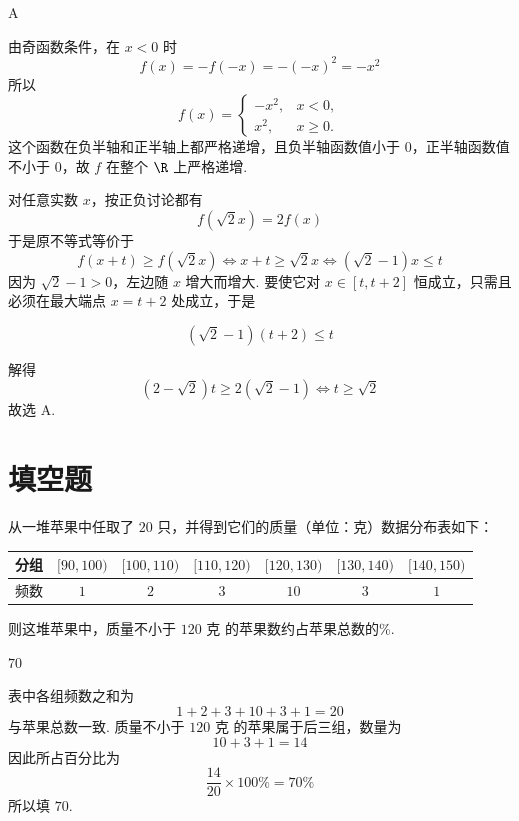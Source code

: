 \begin{answer}
A
\end{answer}

\begin{solution}
由奇函数条件，在 \(x<0\) 时
\[
f(x)=-f(-x)=-(-x)^2=-x^2
\]
所以
\[
f(x)=\begin{cases}
-x^2,&x<0,\\
x^2,&x\geqslant0.
\end{cases}
\]
这个函数在负半轴和正半轴上都严格递增，且负半轴函数值小于 \(0\)，正半轴函数值不小于 \(0\)，故 \(f\) 在整个 \(\R\) 上严格递增.

对任意实数 \(x\)，按正负讨论都有
\[
f(\sqrt2x)=2f(x)
\]
于是原不等式等价于
\[
f(x+t)\geqslant f(\sqrt2x)
\Longleftrightarrow x+t\geqslant\sqrt2x
\Longleftrightarrow (\sqrt2-1)x\leqslant t
\]
因为 \(\sqrt2-1>0\)，左边随 \(x\) 增大而增大. 要使它对 \(x\in[t,t+2]\) 恒成立，只需且必须在最大端点 \(x=t+2\) 处成立，于是

\[
(\sqrt2-1)(t+2)\leqslant t
\]

解得
\[
(2-\sqrt2)t\geqslant2(\sqrt2-1)
\Longleftrightarrow t\geqslant\sqrt2
\]
故选 A.
\end{solution}

\section{填空题}

\begin{problem}
从一堆苹果中任取了 \(20\) 只，并得到它们的质量（单位：克）数据分布表如下：

\begin{center}
\begin{tabular}{|c|c|c|c|c|c|c|}
\hline
分组 & \([90,100)\) & \([100,110)\) & \([110,120)\) & \([120,130)\) & \([130,140)\) & \([140,150)\) \\
\hline
频数 & \(1\) & \(2\) & \(3\) & \(10\) & \(3\) & \(1\) \\
\hline
\end{tabular}
\end{center}

则这堆苹果中，质量不小于 \(120\text{ 克}\) 的苹果数约占苹果总数的\fillinblank{}\%.
\end{problem}

\begin{answer}
\(70\)
\end{answer}

\begin{solution}
表中各组频数之和为
\[
1+2+3+10+3+1=20
\]
与苹果总数一致. 质量不小于 \(120\text{ 克}\) 的苹果属于后三组，数量为
\[
10+3+1=14
\]
因此所占百分比为
\[
\frac{14}{20}\times100\%=70\%
\]
所以填 \(70\).
\end{solution}

